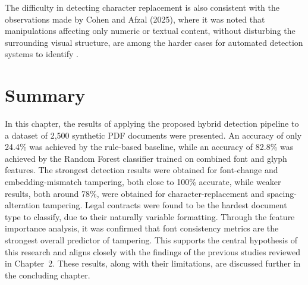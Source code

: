 \noindent The difficulty in detecting character replacement is also consistent with the observations made by Cohen and Afzal (2025), where it was noted that manipulations affecting only numeric or textual content, without disturbing the surrounding visual structure, are among the harder cases for automated detection systems to identify \cite{Cohen2025Forgery}.

\section{Summary}

In this chapter, the results of applying the proposed hybrid detection pipeline to a dataset of 2,500 synthetic PDF documents were presented. An accuracy of only 24.4\% was achieved by the rule-based baseline, while an accuracy of 82.8\% was achieved by the Random Forest classifier trained on combined font and glyph features. The strongest detection results were obtained for font-change and embedding-mismatch tampering, both close to 100\% accurate, while weaker results, both around 78\%, were obtained for character-replacement and spacing-alteration tampering. Legal contracts were found to be the hardest document type to classify, due to their naturally variable formatting. Through the feature importance analysis, it was confirmed that font consistency metrics are the strongest overall predictor of tampering. This supports the central hypothesis of this research and aligns closely with the findings of the previous studies reviewed in Chapter~2. These results, along with their limitations, are discussed further in the concluding chapter.
